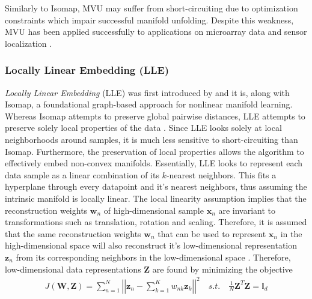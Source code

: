 Similarly to Isomap, MVU may suffer from short-circuiting due to optimization constraints which impair successful manifold unfolding.  Despite this weakness, MVU has been applied successfully to applications on microarray data and sensor localization \citep{VanDerMaaten2009DRReview}.

\subsubsection{Locally Linear Embedding (LLE)} \label{sec:LLE}
\textit{Locally Linear Embedding} (LLE) was first introduced by \cite{Roweis2000LLE} and it is, along with Isomap, a foundational graph-based approach for nonlinear manifold learning.  Whereas Isomap attempts to preserve global pairwise distances, LLE attempts to preserve solely local properties of the data \citep{VanDerMaaten2009DRReview}.  Since LLE looks solely at local neighborhoods around samples, it is much less sensitive to short-circuiting than Isomap.  Furthermore, the preservation of local properties allows the algorithm to effectively embed non-convex manifolds.  Essentially, LLE looks to represent each data sample as a linear combination of its $k$-nearest neighbors.  This fits a hyperplane through every datapoint and it's nearest neighbors, thus assuming the intrinsic manifold is locally linear.  The local linearity assumption implies that the reconstruction weights $\bm{w}_{n}$ of high-dimensional sample $\bm{x}_{n}$ are invariant to transformations such as translation, rotation and scaling.  Therefore, it is assumed that the same reconstruction weights $\bm{w}_{n}$ that can be used to represent $\bm{x}_{n}$ in the high-dimensional space will also reconstruct it's low-dimensional representation $\bm{z}_{n}$ from its corresponding neighbors in the low-dimensional space \citep{Roweis2000LLE, Sorzano2014DRReview, Chao2019RecentAdvancesSupervisedDimRed}.  Therefore, low-dimensional data representations $\bm{Z}$ are found by minimizing the objective
\begin{align} \label{eq:LLE_objective}
	J(\bm{W},\bm{Z}) = \sum_{n=1}^{N} \left | \left | \bm{z}_{n} - \sum_{k=1}^{K}w_{nk}\bm{z}_{k} \right | \right |^{2} \quad s.t. \quad \frac{1}{N}\bm{Z}^{T}\bm{Z}=\bm{\mathbb{I}}_{d}
\end{align} 
